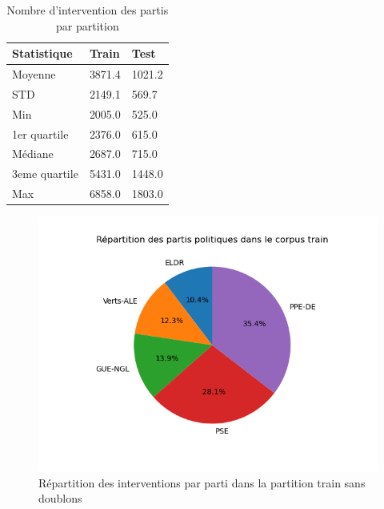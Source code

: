 \begin{table}[ht]
    \centering
\begin{tabular}{|l|l|l|}
\hline
Statistique & Train & Test \\ \hline
Moyenne & 3871.4 & 1021.2 \\ \hline
STD & 2149.1 & 569.7 \\ \hline
Min & 2005.0 & 525.0 \\ \hline
1er quartile & 2376.0 & 615.0 \\ \hline
Médiane & 2687.0 & 715.0\\ \hline
3eme quartile & 5431.0 & 1448.0\\ \hline
Max & 6858.0 & 1803.0\\ \hline
\end{tabular}
\caption{Nombre d'intervention des partis par partition}
\label{tab:stats_dataset}
\end{table}

\begin{figure}[ht]
    \centering
    \includegraphics[width=\columnwidth]{../stats/occurences_par_partis_train_camember.png}
    \caption{Répartition des interventions par parti dans la partition train sans doublons}
    \label{fig:camember_dataset}
\end{figure}
